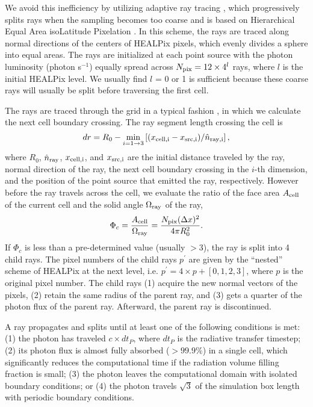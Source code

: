 We avoid this inefficiency by utilizing adaptive ray tracing
\citep{Abel02_RT}, which progressively splits rays when the sampling
becomes too coarse and is based on Hierarchical Equal Area isoLatitude
Pixelation \citep[HEALPix;][]{HEALPix}.  In this scheme, the rays are
traced along normal directions of the centers of HEALPix pixels, which
evenly divides a sphere into equal areas.  The rays are initialized at
each point source with the photon luminosity (photon s$^{-1}$) equally
spread across $N_{\rm pix} = 12 \times 4^l$ rays, where $l$ is the
initial HEALPix level.  We usually find $l$ = 0 or 1 is sufficient
because these coarse rays will usually be split before traversing
the first cell.

The rays are traced through the grid in a typical fashion
\citep[e.g.][]{Abel99_RT}, in which we calculate the next cell
boundary crossing.  The ray segment length crossing the cell is
%
\begin{equation}
  \label{eqn:trace}
  dr = R_0 - \min_{i=1 \rightarrow 3} \left[(x_{\rm cell,i} - x_{\rm src,i}) /
    \hat{n}_{\rm ray,i} \right],
\end{equation}
%
where $R_0$, $\hat{n}_{\rm ray}$, $x_{\rm cell,i}$, and $x_{\rm
  src,i}$ are the initial distance traveled by the ray, normal
direction of the ray, the next cell boundary crossing in the $i$-th
dimension, and the position of the point source that emitted the ray,
respectively.  However before the ray travels across the cell, we
evaluate the ratio of the face area $A_{\rm cell}$ of the current cell
and the solid angle $\Omega_{\rm ray}$ of the ray,
%
\begin{equation}
  \label{eqn:split}
  \Phi_c = \frac{A_{\rm cell}} {\Omega_{\rm ray}} = 
  \frac{N_{\rm pix} (\Delta x)^2} {4\pi R_0^2}.
\end{equation}
%
If $\Phi_c$ is less than a pre-determined value (usually $>3$), the
ray is split into 4 child rays.  The pixel numbers of the child rays
$p^\prime$ are given by the ``nested'' scheme of HEALPix at the next
level, i.e. $p^\prime = 4 \times p + [0,1,2,3]$, where $p$ is the
original pixel number.  The child rays (1) acquire the new normal
vectors of the pixels, (2) retain the same radius of the parent ray,
and (3) gets a quarter of the photon flux of the parent ray.
Afterward, the parent ray is discontinued.

A ray propagates and splits until at least one of the following conditions is met: (1) the photon has traveled $c
\times dt_P$, where $dt_P$ is the radiative transfer timestep; (2) its
photon flux is almost fully absorbed ($>99.9\%$) in a single cell,
which significantly reduces the computational time if the radiation
volume filling fraction is small; (3) the photon leaves the
computational domain with isolated boundary conditions; or (4) the
photon travels $\sqrt{3}$ of the simulation box length with periodic
boundary conditions.

